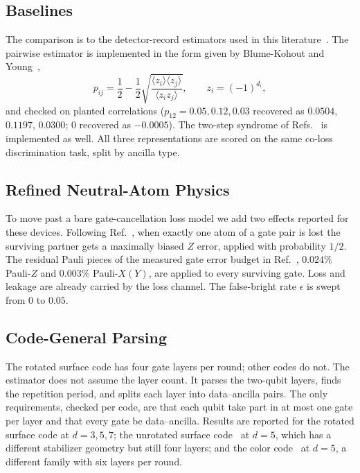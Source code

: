 \documentclass{ieeeaccess}
\begin{document}
\subsection{Baselines}
\label{sec:methods-baselines}

The comparison is to the detector-record estimators used in this
literature~\cite{spitz2018adaptiveweight,blumekohout2025detectorerrormodels}.
The pairwise estimator is implemented in the form given by Blume-Kohout and
Young~\cite{blumekohout2025detectorerrormodels},
\begin{equation}
  p_{ij} = \frac{1}{2} - \frac{1}{2}\sqrt{\frac{\langle z_i\rangle\langle z_j\rangle}{\langle z_i z_j\rangle}},
  \qquad z_i = (-1)^{d_i},
  \label{eq:pij}
\end{equation}
and checked on planted correlations ($p_{12}=0.05, 0.12, 0.03$ recovered as
$0.0504$, $0.1197$, $0.0300$; $0$ recovered as $-0.0005$). The two-step
syndrome of
Refs.~\cite{bultink2020repetitiveparity,varbanov2020leakagedetection} is
implemented as well. All three representations are scored on the same co-loss
discrimination task, split by ancilla type.

\subsection{Refined Neutral-Atom Physics}
\label{sec:methods-realism}

To move past a bare gate-cancellation loss model we add two effects reported
for these devices. Following Ref.~\cite{perrin2025qecatomloss}, when exactly
one atom of a gate pair is lost the surviving partner gets a maximally biased
$Z$ error, applied with probability $1/2$. The residual Pauli pieces of the
measured gate error budget in Ref.~\cite{evered2026highfidelitygates},
$0.024\%$ Pauli-$Z$ and $0.003\%$ Pauli-$X(Y)$, are applied to every surviving
gate. Loss and leakage are already carried by the loss channel. The
false-bright rate $\epsilon$ is swept from $0$ to $0.05$.

\subsection{Code-General Parsing}
\label{sec:methods-generality}

The rotated surface code has four gate layers per round; other codes do not.
The estimator does not assume the layer count. It parses the two-qubit layers,
finds the repetition period, and splits each layer into data--ancilla pairs.
The only requirements, checked per code, are that each qubit take part in at
most one gate per layer and that every gate be data--ancilla. Results are
reported for the rotated surface code at $d=3,5,7$; the unrotated surface
code~\cite{dennis2002topologicalmemory,fowler2012surfacecodes} at $d=5$, which
has a different stabilizer geometry but still four layers; and the color
code~\cite{bombin2006colorcodes} at $d=5$, a different family with six layers
per round.
\end{document}
